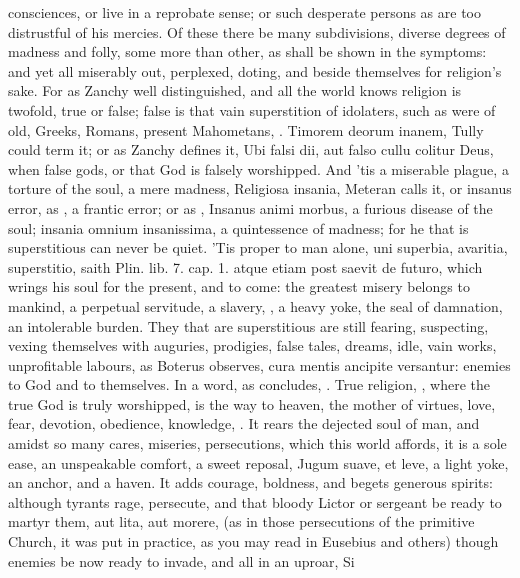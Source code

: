 {consciences, or live in a reprobate sense; or such desperate persons as
are too distrustful of his mercies. Of these there be many
subdivisions, diverse degrees of madness and folly, some more than
other, as shall be shown in the symptoms: and yet all miserably out,
perplexed, doting, and beside themselves for religion's sake. For as
Zanchy well distinguished, and all the world knows religion is
twofold, true or false; false is that vain superstition of idolaters,
such as were of old, Greeks, Romans, present Mahometans, \etc{}. Timorem
deorum inanem, Tully could term it; or as Zanchy defines it, Ubi
falsi dii, aut falso cullu colitur Deus, when false gods, or that God
is falsely worshipped. And 'tis a miserable plague, a torture of the
soul, a mere madness, Religiosa insania, Meteran calls it, or
insanus error, as \Seneca, a frantic error; or as \Austin{}, Insanus
animi morbus, a furious disease of the soul; insania omnium
insanissima, a quintessence of madness; for he that is
superstitious can never be quiet. 'Tis proper to man alone, uni
superbia, avaritia, superstitio, saith Plin. lib. 7. cap. 1. atque
etiam post saevit de futuro, which wrings his soul for the present, and
to come: the greatest misery belongs to mankind, a perpetual servitude,
a slavery, , a heavy yoke, the seal of damnation,
an intolerable burden. They that are superstitious are still fearing,
suspecting, vexing themselves with auguries, prodigies, false tales,
dreams, idle, vain works, unprofitable labours, as Boterus
observes, cura mentis ancipite versantur: enemies to God and to
themselves. In a word, as \Seneca concludes, . True religion, , where the true God is
truly worshipped, is the way to heaven, the mother of virtues, love,
fear, devotion, obedience, knowledge, \etc{}. It rears the dejected soul of
man, and amidst so many cares, miseries, persecutions, which this world
affords, it is a sole ease, an unspeakable comfort, a sweet reposal,
Jugum suave, et leve, a light yoke, an anchor, and a haven. It adds
courage, boldness, and begets generous spirits: although tyrants rage,
persecute, and that bloody Lictor or sergeant be ready to martyr them,
aut lita, aut morere, (as in those persecutions of the primitive
Church, it was put in practice, as you may read in Eusebius and others)
though enemies be now ready to invade, and all in an uproar, Si
}
